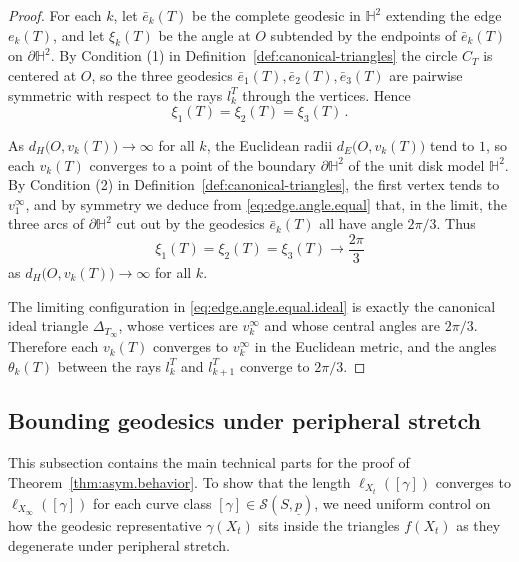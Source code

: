 \documentclass[11pt, letterpaper]{amsart}
\theoremstyle{definition}
\theoremstyle{remark}
\newcommand{\up}{\underline{p}}
\newcommand{\Sp}{(S,\up)}
\newcommand{\bH}{\mathbb{H}}
\newcommand{\cS}{\mathcal{S}}
\numberwithin{equation}{section}
\begin{document}
\begin{proof}
For each \(k\), let \(\bar e_k(T)\) be the complete geodesic in \(\bH^2\) extending the edge \(e_k(T)\), and let \(\xi_k(T)\) be the angle at \(O\) subtended by the endpoints of \(\bar e_k(T)\) on \(\partial\bH^2\).
By Condition (1) in Definition~\ref{def:canonical-triangles} the circle \(C_T\) is centered at \(O\), so the three geodesics \(\bar e_1(T),\bar e_2(T),\bar e_3(T)\) are pairwise symmetric with respect to the rays \(l_k^T\) through the vertices.
Hence
\begin{equation}\label{eq:edge.angle.equal}
  \xi_1(T)=\xi_2(T)=\xi_3(T)\, .
\end{equation}

As \(d_H\bigl(O,v_k(T)\bigr)\to\infty\) for all \(k\), the Euclidean radii \(d_E\bigl(O,v_k(T)\bigr)\) tend to \(1\), so each \(v_k(T)\) converges to a point of the boundary \(\partial\bH^2\) of the unit disk model \(\bH^2\).
By Condition (2) in Definition~\ref{def:canonical-triangles}, the first vertex tends to \(v_1^{\infty}\), and by symmetry we deduce from \eqref{eq:edge.angle.equal} that, in the limit, the three arcs of \(\partial\bH^2\) cut out by the geodesics \(\bar e_k(T)\) all have angle \(2\pi/3\).
Thus
\begin{equation}\label{eq:edge.angle.equal.ideal}
  \xi_1(T)=\xi_2(T)=\xi_3(T)\longrightarrow \frac{2\pi}{3}
\end{equation}
as \(d_H\bigl(O,v_k(T)\bigr)\to\infty\) for all \(k\).

The limiting configuration in \eqref{eq:edge.angle.equal.ideal} is exactly the canonical ideal triangle \(\Delta_{T_{\infty}}\), whose vertices are \(v_k^{\infty}\) and whose central angles are \(2\pi/3\).
Therefore each \(v_k(T)\) converges to \(v_k^{\infty}\) in the Euclidean metric, and the angles \(\theta_k(T)\) between the rays \(l_k^T\) and \(l_{k+1}^T\) converge to \(2\pi/3\).
\end{proof}


\subsection{Bounding geodesics under peripheral stretch}
\label{subsec:bounding-geodesics}

This subsection contains the main technical parts for the proof of Theorem~\ref{thm:asym.behavior}.
To show that the length \(\ell_{X_t}([\gamma])\) converges to \(\ell_{X_{\infty}}([\gamma])\) for each curve class \([\gamma]\in\cS\Sp\), we need uniform control on how the geodesic representative \(\gamma(X_t)\) sits inside the triangles \(f(X_t)\) as they degenerate under peripheral stretch.
\end{document}
